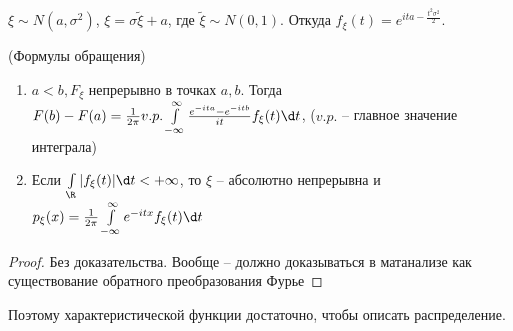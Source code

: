 $\xi \sim N(a, \sigma^2)$, $\xi = \sigma \widetilde{\xi} + a$, где $\widetilde{\xi} \sim N(0, 1)$. Откуда $f_\xi(t) = e^{ita - \frac{t^2\sigma^2}{2}}$.

\begin{theorem} (Формулы обращения)
                                  
\begin{enumerate}
\item $a < b, F_\xi$ непрерывно в точках $a, b$. Тогда $F(b) - F(a) = \frac{1}{2\pi} v.p. \int\limits_{-\infty}^\infty \frac{e^{-ita} - e^{-itb}}{it}f_\xi(t) \d t$, ($v.p.$ -- главное значение интеграла)

\item Если $\int\limits_\R |f_\xi(t)| \d t < +\infty$, то $\xi$ -- абсолютно непрерывна и $p_\xi(x) = \frac{1}{2\pi} \int\limits_{-\infty}^\infty e^{-itx}f_\xi(t) \d t$
\end{enumerate}
\end{theorem}
\begin{proof}
Без доказательства. Вообще -- должно доказываться в матанализе как существование обратного преобразования Фурье
\end{proof}
Поэтому характеристической функции достаточно, чтобы описать распределение.


